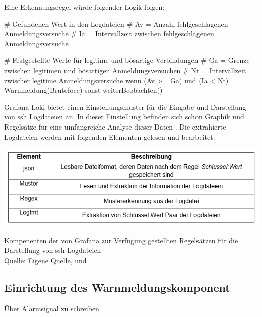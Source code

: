 Eine Erkennungsregel würde folgender Logik folgen:
{
\begin{spverbatim}
   # Gefundenen Wert in den Logdateien
   # Av = Anzahl fehlgeschlagenen Anmeldungsversuche
   # Ia = Intervallzeit zwischen fehlgeschlagenen Anmeldungsversuche

   # Festgestellte Werte für legitime und bösartige Verbindungen
   # Ga = Grenze zwischen legitimen und bösartigen Anmeldungsversuchen
   # Nt = Intervallzeit zwischer legitime Anmeldungsversuche
   wenn (Av >= Ga) und (Ia < Nt)
      Warnmeldung(Brutefoce)
   sonst
      weiterBeobachten()
\end{spverbatim}
}

Grafana Loki bietet einen Einstellungsmuster für die Eingabe und Darstellung von \gls{ssh} Logdateien an. In dieser Einstellung befinden sich schon Graphik und Regelsätze für eine umfangreiche Analyse dieser Daten \citep{VoidQuark_sshlogs}. Die extrahierte Logdateien werden mit folgenden Elementen gelesen und bearbeitet:

\begin{table}[H]
   \includegraphics[width=\linewidth]{assets/tabelle_sshgrafana.png}
   \caption{Kompenenten der von Grafana zur Verfügung gestellten Regelsätzen für die Darstellung von \gls{ssh} Logdateien  \\Quelle: Eigene Quelle, \citep{VoidQuark_sshlogs} und \citep{Setter_Logfmt}}
\end{table}

\subsection{Einrichtung des Warnmeldungskomponent}
Über Alarmsignal zu schreiben





